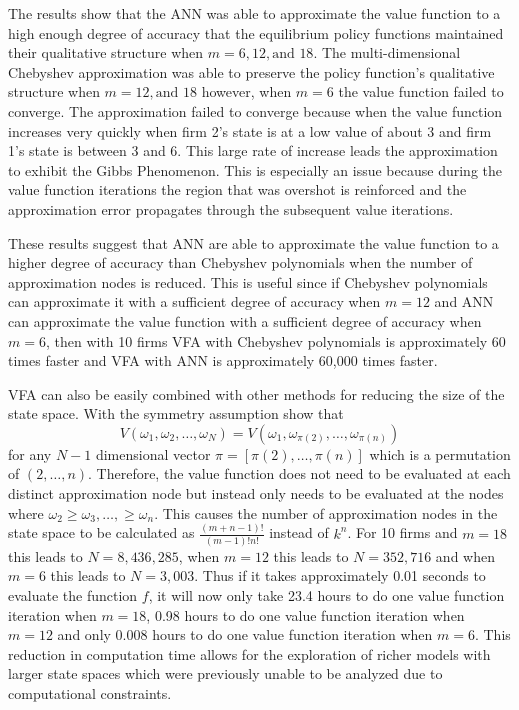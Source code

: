 \documentclass[12pt]{article}
\begin{document}
The results show that the ANN was able to approximate the value function to a high enough degree of accuracy that the equilibrium policy functions maintained their qualitative structure when $m=6,12,\text{and }18$. The multi-dimensional Chebyshev approximation was able to preserve the policy function's qualitative structure when $m=12, \text{and } 18$ however, when $m=6$ the value function failed to converge. The approximation failed to converge because when the value function increases very quickly when firm 2's state is at a low value of about 3 and firm 1's state is between 3 and 6. This large rate of increase leads the approximation to exhibit the Gibbs Phenomenon. This is especially an issue because during the value function iterations the region that was overshot is reinforced and the approximation error propagates through the subsequent value iterations.

These results suggest that ANN are able to approximate the value function to a higher degree of accuracy than Chebyshev polynomials when the number of approximation nodes is reduced. This is useful since if Chebyshev polynomials can approximate it with a sufficient degree of accuracy when $m=12$ and ANN can approximate the value function with a sufficient degree of accuracy when $m=6$, then with 10 firms VFA with Chebyshev polynomials is approximately 60 times faster and VFA with ANN is approximately 60,000 times faster.

VFA can also be easily combined with other methods for reducing the size of the state space. With the symmetry assumption \citet{1992_Pakes_McGuire_NBER} show that
\begin{equation*}
  V(\omega_1,\omega_2,\dots,\omega_N)=V(\omega_1,\omega_{\pi(2)},\dots,\omega_{\pi(n)})
\end{equation*}
for any $N-1$ dimensional vector $\pi=[\pi(2),\dots,\pi(n)]$ which is a permutation of $(2,\dots,n)$. Therefore, the value function does not need to be evaluated at each distinct approximation node but instead only needs to be evaluated at the nodes where $\omega_2\geq \omega_3,\dots,\geq \omega_n$. This causes the number of approximation nodes in the state space to be calculated as $\frac{(m+n-1)!}{(m-1)!n!}$ instead of $k^n$. For 10 firms and $m=18$ this leads to $N=8,436,285$, when $m=12$ this leads to $N=352,716$ and when $m=6$ this leads to $N=3,003$. Thus if it takes approximately 0.01 seconds to evaluate the function $f$, it will now only take 23.4 hours to do one value function iteration when $m=18$, 0.98 hours to do one value function iteration when $m=12$ and only 0.008 hours to do one value function iteration when $m=6$. This reduction in computation time allows for the exploration of richer models with larger state spaces which were previously unable to be analyzed due to computational constraints.
\end{document}
